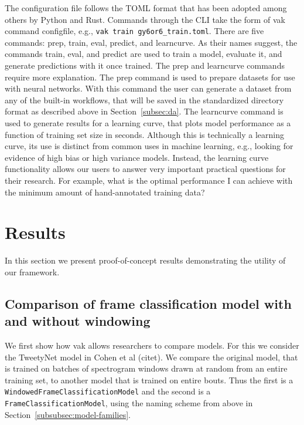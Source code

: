 The configuration file follows the TOML format that has been adopted among others by Python and Rust. Commands through the CLI take the form of vak command configfile, e.g., \texttt{vak train gy6or6\_train.toml}. There are five commands: prep, train, eval, predict, and learncurve. As their names suggest, the commands train, eval, and predict are used to train a model, evaluate it, and generate predictions with it once trained. The prep and learncurve commands require more explanation. The prep command is used to prepare datasets for use with neural networks. With this command the user can generate a dataset from any of the built-in workflows, that will be saved in the standardized directory format as described above in Section~\ref{subsec:da}. The learncurve command is used to generate results for a learning curve, that plots model performance as a function of training set size in seconds. Although this is technically a learning curve, its use is distinct from common uses in machine learning, e.g., looking for evidence of high bias or high variance models. Instead, the learning curve functionality allows our users to answer very important practical questions for their research. For example, what is the optimal performance I can achieve with the minimum amount of hand-annotated training data?


\section{Results \label{sec:results}}

In this section we present proof-of-concept results demonstrating the utility of our framework.

\subsection{Comparison of frame classification model with and without windowing}

We first show how vak allows researchers to compare models.
For this we consider the TweetyNet model in Cohen et al (citet).
We compare the original model, that is trained on batches of spectrogram windows drawn at random from an entire training set, to another model that is trained on entire bouts. Thus the first is a \texttt{WindowedFrameClassificationModel} and the second is a \texttt{FrameClassificationModel}, using the naming scheme from above in Section~\ref{subsubsec:model-families}.

